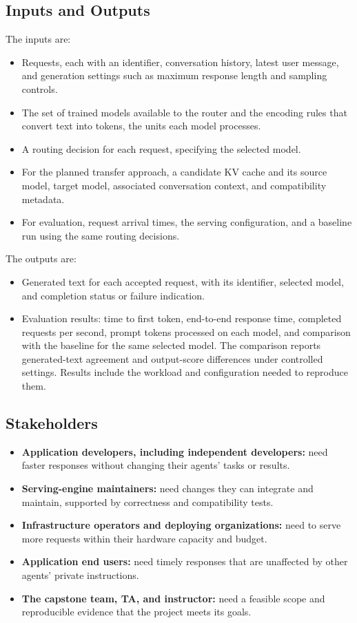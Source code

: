 \documentclass[11pt]{article}
\begin{document}
\subsection{Inputs and Outputs}

The inputs are:
\begin{itemize}[noitemsep]
  \item Requests, each with an identifier, conversation history, latest
  user message, and generation settings such as maximum response length
  and sampling controls.
  \item The set of trained models available to the router and the encoding
  rules that convert text into tokens, the units each model processes.
  \item A routing decision for each request, specifying the selected model.
  \item For the planned transfer approach, a candidate KV cache and its
  source model, target model, associated conversation context, and
  compatibility metadata.
  \item For evaluation, request arrival times, the serving configuration,
  and a baseline run using the same routing decisions.
\end{itemize}

The outputs are:
\begin{itemize}[noitemsep]
  \item Generated text for each accepted request, with its identifier,
  selected model, and completion status or failure indication.
  \item Evaluation results: time to first token, end-to-end response time,
  completed requests per second, prompt tokens processed on each model,
  and comparison with the baseline for the same selected model. The
  comparison reports generated-text agreement and output-score differences
  under controlled settings. Results include the workload and configuration
  needed to reproduce them.
\end{itemize}

\subsection{Stakeholders}
\label{sec:stakeholders}

\begin{itemize}
  \item \textbf{Application developers, including independent developers:}
  need faster responses without changing their agents' tasks or results.
  \item \textbf{Serving-engine maintainers:} need changes they can
  integrate and maintain, supported by correctness and compatibility tests.
  \item \textbf{Infrastructure operators and deploying organizations:}
  need to serve more requests within their hardware capacity and budget.
  \item \textbf{Application end users:} need timely responses that are
  unaffected by other agents' private instructions.
  \item \textbf{The capstone team, TA, and instructor:} need a feasible
  scope and reproducible evidence that the project meets its goals.
\end{itemize}
\end{document}
